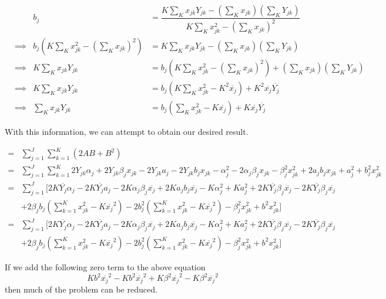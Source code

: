 \documentclass[]{article}
\begin{document}
\begin{align*}
& & b_j &= \dfrac{K\sum_K x_{jk}Y_{jk} - (\sum_Kx_{jk})(\sum_KY_{jk})}{K\sum_Kx_{jk}^2 - (\sum_Kx_{jk})^2}\\
& \implies & b_j(K\sum_Kx_{jk}^2 - (\sum_Kx_{jk})^2) &= K\sum_K x_{jk}Y_{jk} - (\sum_Kx_{jk})(\sum_KY_{jk})\\
& \implies & K\sum_K x_{jk}Y_{jk} &= b_j(K\sum_Kx_{jk}^2 - (\sum_Kx_{jk})^2) + (\sum_Kx_{jk})(\sum_KY_{jk})\\
& \implies & K\sum_K x_{jk}Y_{jk} &= b_j(K\sum_Kx_{jk}^2 - K^2\overline{x_{j}}) + K^2\overline{x_j}\overline{Y_j}\\
& \implies & \sum_K x_{jk}Y_{jk}  &= b_j(\sum_Kx_{jk}^2 - K\overline{x_{j}}) + K\overline{x_j}\overline{Y_j}
\end{align*}

With this information, we can attempt to obtain our desired result.

\begin{align*}
=& \sum_{j=1}^J\sum_{k=1}^K(2AB + B^2) \\
=& \sum_{j=1}^J\sum_{k=1}^K2Y_{jk}\alpha_j + 2Y_{jk}\beta_jx_{jk} - 2Y_{jk}a_j - 2Y_{jk}b_jx_{jk} - \alpha_j^2 - 2\alpha_j\beta_jx_{jk} - \beta_j^2x_{jk}^2 + 2a_jb_jx_{jk} + a_j^2 + b_j^2x_{jk}^2\\
=& \sum_{j=1}^J [2K\overline{Y_j}\alpha_j - 2K\overline{Y_j}a_j - 2K\alpha_j\beta_j\overline{x_j} + 2Ka_jb_j\overline{x_j} - K\alpha_j^2 + Ka_j^2 + 2K\overline{Y_j}\beta_j\overline{x_j} - 2K\overline{Y_j}\beta_j\overline{x_j}\\
 &+ 2\beta_jb_j(\sum_{k=1}^Kx_{jk}^2 - K\overline{x_j}^2) - 2b_j^2(\sum_{k=1}^Kx_{jk}^2 - K\overline{x_j}^2) - \beta_j^2x_{jk}^2 + b^2x_{jk}^2 ]\\
=& \sum_{j=1}^J [2K\overline{Y_j}\alpha_j - 2K\overline{Y_j}a_j - 2K\alpha_j\beta_j\overline{x_j} + 2Ka_jb_j\overline{x_j} - K\alpha_j^2 + Ka_j^2 + 2K\overline{Y_j}\beta_j\overline{x_j} - 2K\overline{Y_j}\beta_j\overline{x_j}\\
 &+ 2\beta_jb_j(\sum_{k=1}^Kx_{jk}^2 - K\overline{x_j}^2) - 2b_j^2(\sum_{k=1}^Kx_{jk}^2 - K\overline{x_j}^2) - \beta_j^2x_{jk}^2 + b^2x_{jk}^2 ]
\end{align*}

If we add the following zero term to the above equation
\[Kb^2\overline{x_j}^2 - Kb^2\overline{x_j}^2 + K\beta^2\overline{x_j}^2 - K\beta^2\overline{x_j}^2\]
then much of the problem can be reduced.
\end{document}
